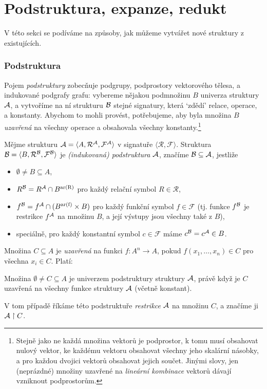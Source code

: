 \section{Podstruktura, expanze, redukt}

V této sekci se podíváme na způsoby, jak můžeme vytvářet nové struktury z existujících.

\subsubsection{Podstruktura}

Pojem \emph{podstruktury} zobecňuje podgrupy, podprostory vektorového tělesa, a indukované podgrafy grafu: vybereme nějakou podmnožinu $B$ univerza struktury $\mathcal{A}$, a vytvoříme na ní strukturu $\mathcal{B}$ stejné signatury, která `zdědí' relace, operace, a konstanty. Abychom to mohli provést, potřebujeme, aby byla množina $B$ \emph{uzavřená} na všechny operace a obsahovala všechny konstanty.\footnote{Stejně jako ne každá množina vektorů je podprostor, k tomu musí obsahovat nulový vektor, ke každému vektoru obsahovat všechny jeho skalární násobky, a pro každou dvojici vektorů obsahovat jejich součet. Jinými slovy, jen (neprázdné) množiny uzavřené na \emph{lineární kombinace} vektorů dávají vzniknout podprostorům.}

\begin{definition}[Podstruktura]
Mějme strukturu $\mathcal{A}=\langle A,\mathcal R^\mathcal A,\mathcal F^\mathcal A\rangle$ v signatuře $\langle\mathcal R,\mathcal F\rangle$. Struktura $\mathcal{B}=\langle B,\mathcal R^\mathcal B,\mathcal F^\mathcal B\rangle$ je \emph{(indukovaná) podstruktura $\mathcal{A}$}, značíme $\mathcal{B}\subseteq\mathcal{A}$, jestliže
\begin{itemize}
    \item $\emptyset\neq B\subseteq A$,
    \item $R^{\mathcal{B}}=R^{\mathcal{A}}\cap B^{\mathrm{ar(R)}}$ pro každý relační symbol $R\in \mathcal R$,
    \item $f^{\mathcal{B}}=f^{\mathcal{A}}\cap (B^{\mathrm{ar(f)}}\times B)$ pro každý funkční symbol $f\in \mathcal F$ (tj. funkce $f^{\mathcal{B}}$ je restrikce $f^{\mathcal{A}}$ na množinu $B$, a její výstupy jsou všechny také z $B$),
    \item speciálně, pro každý konstantní symbol $c\in\mathcal F$ máme $c^{\mathcal{B}}=c^{\mathcal{A}}\in B$.
\end{itemize}
\end{definition}
Množina $C\subseteq A$ je \emph{uzavřená} na funkci $f:A^n\to A$, pokud $f(x_1,\dots,x_n)\in C$ pro všechna $x_i\in C$. Platí:
\begin{observation}
    Množina $\emptyset\neq C\subseteq A$ je univerzem podstruktury struktury $\mathcal{A}$, právě když je $C$ uzavřená na všechny funkce struktury $\mathcal{A}$ (včetně konstant).
\end{observation}
V tom případě říkáme této podstruktuře \emph{restrikce} $\mathcal{A}$ na množinu $C$, a značíme ji $\mathcal{A}\restriction C$.

